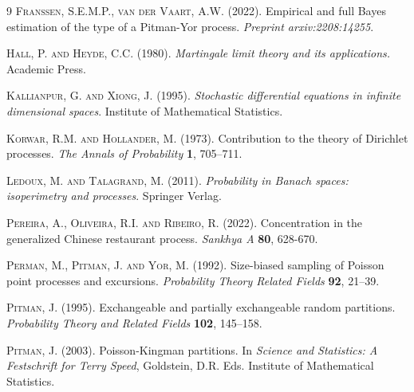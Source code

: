 \documentclass[twoside,12pt]{article}
\begin{document}
\begin{thebibliography}{9}
\textsc{Franssen, S.E.M.P., van der Vaart, A.W.} (2022). Empirical and full Bayes estimation of the type of a Pitman-Yor process. \textit{Preprint arxiv:2208:14255}.

\textsc{Hall, P.  and Heyde, C.C.} (1980). \textit{Martingale limit theory and its applications.} Academic Press.


\textsc{Kallianpur, G. and Xiong, J.} (1995). \textit{Stochastic differential equations in infinite dimensional spaces}. Institute of Mathematical Statistics.

\textsc{Korwar, R.M. and Hollander, M.} (1973). Contribution to the theory of Dirichlet processes. \textit{The Annals of Probability} \textbf{1}, 705--711.

\textsc{Ledoux, M. and Talagrand, M.} (2011). \textit{Probability in Banach spaces: isoperimetry and processes}. Springer Verlag.


\textsc{Pereira, A., Oliveira, R.I. and Ribeiro, R.} (2022). Concentration in the generalized Chinese restaurant process. \textit{Sankhya A} \textbf{80}, 628-670.

\textsc{Perman, M., Pitman, J. and Yor, M.} (1992). Size-biased sampling of Poisson point processes and excursions. \textit{Probability Theory Related Fields} \textbf{92}, 21--39.

\textsc{Pitman, J.} (1995). Exchangeable and partially exchangeable random partitions. \textit{Probability Theory and Related Fields} \textbf{102}, 145--158.

\textsc{Pitman, J.} (2003). Poisson-Kingman partitions. In \textit{Science and Statistics: A Festschrift for Terry Speed}, Goldstein, D.R. Eds. Institute of Mathematical Statistics.


\end{thebibliography}
\end{document}
